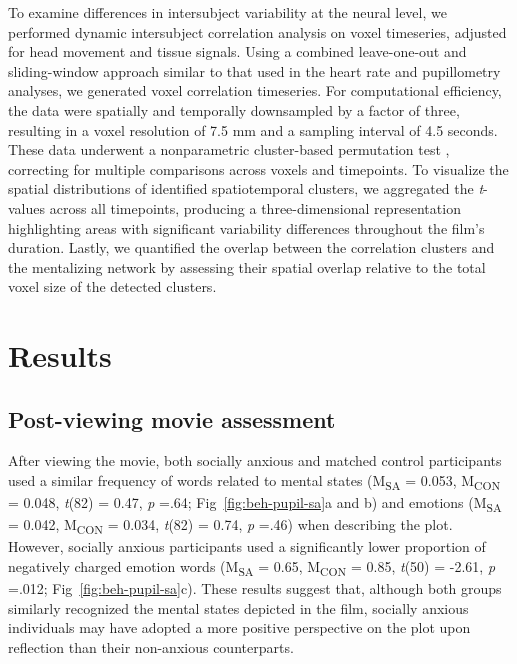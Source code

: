 To examine differences in intersubject variability at the neural level, we performed dynamic intersubject correlation analysis on voxel timeseries, adjusted for head movement and tissue signals. Using a combined leave-one-out and sliding-window approach similar to that used in the heart rate and pupillometry analyses, we generated voxel correlation timeseries. For computational efficiency, the data were spatially and temporally downsampled by a factor of three, resulting in a voxel resolution of 7.5 mm and a sampling interval of 4.5 seconds. These data underwent a nonparametric cluster-based permutation test \citep{mangnus2024bpcnni}, correcting for multiple comparisons across voxels and timepoints. To visualize the spatial distributions of identified spatiotemporal clusters, we aggregated the \textit{t}-values across all timepoints, producing a three-dimensional representation highlighting areas with significant variability differences throughout the film's duration. Lastly, we quantified the overlap between the correlation clusters and the mentalizing network by assessing their spatial overlap relative to the total voxel size of the detected clusters.

\section{Results}

\subsection{Post-viewing movie assessment}
After viewing the movie, both socially anxious and matched control participants used a similar frequency of words related to mental states (M\textsubscript{SA} = 0.053, M\textsubscript{CON} = 0.048, \textit{t}(82) = 0.47, \textit{p} =.64; Fig~\ref{fig:beh-pupil-sa}a and b) and emotions (M\textsubscript{SA} = 0.042, M\textsubscript{CON} = 0.034, \textit{t}(82) = 0.74, \textit{p} =.46) when describing the plot. However, socially anxious participants used a significantly lower proportion of negatively charged emotion words (M\textsubscript{SA} = 0.65, M\textsubscript{CON} = 0.85, \textit{t}(50) = -2.61, \textit{p} =.012; Fig~\ref{fig:beh-pupil-sa}c). These results suggest that, although both groups similarly recognized the mental states depicted in the film, socially anxious individuals may have adopted a more positive perspective on the plot upon reflection than their non-anxious counterparts.



